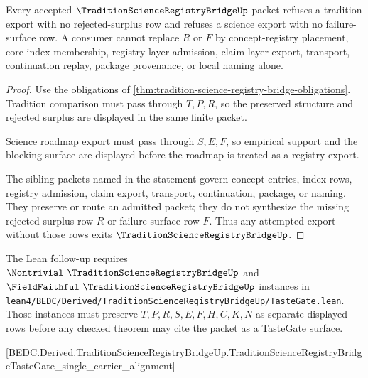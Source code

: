 \begin{theorem}
\label{thm:tradition-science-registry-bridge-nonescape}
Every accepted $\TraditionScienceRegistryBridgeUp$ packet refuses a tradition export with no rejected-surplus row and refuses a science export with no failure-surface row. A consumer cannot replace $R$ or $F$ by concept-registry placement, core-index membership, registry-layer admission, claim-layer export, transport, continuation replay, package provenance, or local naming alone.
\end{theorem}
\begin{proof}
Use the obligations of \autoref{thm:tradition-science-registry-bridge-obligations}. Tradition comparison must pass through $T,P,R$, so the preserved structure and rejected surplus are displayed in the same finite packet.

Science roadmap export must pass through $S,E,F$, so empirical support and the blocking surface are displayed before the roadmap is treated as a registry export.

The sibling packets named in the statement govern concept entries, index rows, registry admission, claim export, transport, continuation, package, or naming. They preserve or route an admitted packet; they do not synthesize the missing rejected-surplus row $R$ or failure-surface row $F$. Thus any attempted export without those rows exits $\TraditionScienceRegistryBridgeUp$.
\end{proof}



The Lean follow-up requires $\Nontrivial\ \TraditionScienceRegistryBridgeUp$ and $\FieldFaithful\ \TraditionScienceRegistryBridgeUp$ instances in \texttt{lean4/BEDC/Derived/TraditionScienceRegistryBridgeUp/TasteGate.lean}. Those instances must preserve $T,P,R,S,E,F,H,C,K,N$ as separate displayed rows before any checked theorem may cite the packet as a TasteGate surface.

[BEDC.Derived.TraditionScienceRegistryBridgeUp.TraditionScienceRegistryBridgeTasteGate\_single\_carrier\_alignment]

